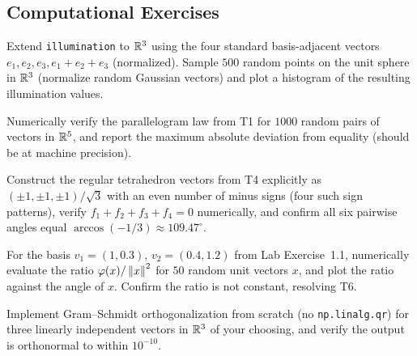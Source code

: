 \subsection*{Computational Exercises}
\begin{compexercises}
	\item Extend \texttt{illumination} to $\mathbb{R}^3$ using the four standard
	basis-adjacent vectors $e_1,e_2,e_3,e_1+e_2+e_3$ (normalized).
	Sample $500$ random points on the unit sphere in $\mathbb{R}^3$ (normalize
	random Gaussian vectors) and plot a histogram of the resulting
	illumination values.
	
	\item Numerically verify the parallelogram law from T1 for $1000$ random
	pairs of vectors in $\mathbb{R}^5$, and report the maximum absolute
	deviation from equality (should be at machine precision).
	
	\item Construct the regular tetrahedron vectors from T4 explicitly as
	$(\pm1,\pm1,\pm1)/\sqrt3$ with an even number of minus signs (four
	such sign patterns), verify $f_1+f_2+f_3+f_4=0$ numerically, and
	confirm all six pairwise angles equal $\arccos(-1/3)\approx
	109.47^\circ$.
	
	\item For the basis $v_1=(1,0.3)$, $v_2=(0.4,1.2)$ from Lab
	Exercise~1.1, numerically evaluate the ratio
	$\varphi(x)/\left\| x \right\|^2$ for $50$ random unit vectors $x$, and plot
	the ratio against the angle of $x$. Confirm the ratio is not
	constant, resolving T6.
	
	\item Implement Gram--Schmidt orthogonalization from scratch (no
	\texttt{np.linalg.qr}) for three linearly independent vectors in
	$\mathbb{R}^3$ of your choosing, and verify the output is orthonormal to
	within $10^{-10}$.
\end{compexercises}